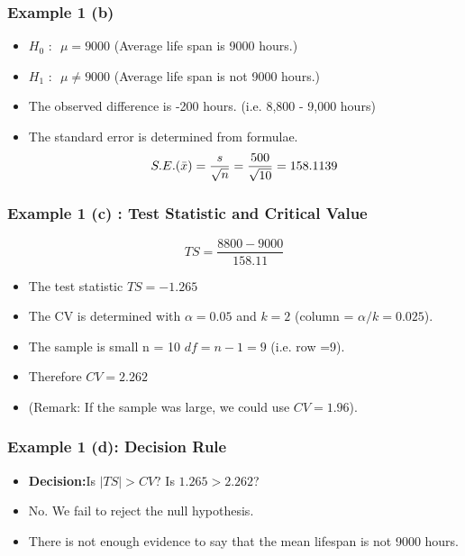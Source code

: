\documentclass[a4]{beamer}
\begin{document}
\begin{frame}
\frametitle{Example 1 (b) }
\large
\begin{itemize}
\item $H_0 \mbox{ : } $ $\mu = 9000$ (Average life span is 9000 hours.)
\item $H_1 \mbox{ : } $ $\mu \neq 9000$ (Average life span is not 9000 hours.)
\end{itemize}
\bigskip
\begin{itemize}
\item The observed difference is -200 hours. (i.e. 8,800 - 9,000 hours)
\item The standard error is determined from formulae.
\[ S.E. (\bar{x}) = {s \over \sqrt{n}} = {500 \over \sqrt{10}}  = 158.1139 \]
\end{itemize}
\end{frame}
\begin{frame}[fragile]
\frametitle{Example 1 (c) : Test Statistic and Critical Value }
\large
\[ TS = \frac{8800 - 9000}{158.11} \]
\begin{itemize}
\item The test statistic $TS = -1.265$
\item The CV is determined with $\alpha = 0.05$ and $k = 2$ (column = $\alpha/k=0.025$).
\item The sample is small n = 10 $df = n-1 = 9$ (i.e. row =9).
\item Therefore $CV = 2.262$

\item (Remark: If the sample was large, we could use $CV = 1.96$).

\end{itemize}
\end{frame}

\begin{frame}
\frametitle{Example 1 (d): Decision Rule }
\large
\begin{itemize}
\item \textbf{Decision:}Is $|TS| >CV$? Is $1.265 > 2.262$?
\item No. We fail to reject the null hypothesis. \item There is not enough evidence to say that the mean lifespan is not 9000 hours.
\end{itemize}
\end{frame}
\end{document}
